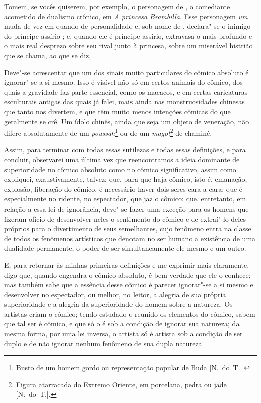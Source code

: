 Tomem, se vocês quiserem, por exemplo, o personagem de , o
comediante acometido de dualismo crônico, em \textit{A princesa
Brambilla}. Esse personagem \textit{um }muda de vez em quando de
personalidade e, sob nome de , declara"-se o inimigo do
príncipe assírio ; e, quando ele é príncipe assírio,
extravasa o mais profundo e o mais real desprezo sobre seu rival junto
à princesa, sobre um miserável histrião que se chama, ao que se diz,
.

Deve"-se acrescentar que um dos sinais muito particulares do cômico
absoluto é ignorar"-se a si mesmo. Isso é visível não só em certos
animais do cômico, dos quais a gravidade faz parte essencial, como os
macacos, e em certas caricaturas esculturais antigas das quais já
falei, mais ainda nas monstruosidades chinesas que tanto nos divertem,
e que têm muito menos intenções cômicas do que geralmente se crê. Um
ídolo chinês, ainda que seja um objeto de veneração, não difere
absolutamente de um \textit{poussah}\footnote{ Busto de um homem gordo
ou representação popular de Buda [N.~do~T.].}\textit{ }ou de um		
\textit{magot}\footnote{ Figura atarracada do Extremo Oriente, em
porcelana, pedra ou jade [N.~do~T.].} de chaminé.

Assim, para terminar com todas essas sutilezas e todas essas definições,
e para concluir, observarei uma última vez que reencontramos a ideia
dominante de superioridade no cômico absoluto como no cômico
significativo, assim como expliquei, exaustivamente, talvez; que, para
que haja cômico, isto é, emanação, explosão, liberação do cômico, é
necessário haver dois seres cara a cara; que é especialmente no
ridente, no espectador, que jaz o cômico; que, entretanto, em relação a
essa lei de ignorância, deve"-se fazer uma exceção para os homens que
fizeram ofício de desenvolver neles o sentimento do cômico e de
extraí"-lo deles próprios para o divertimento de seus semelhantes, cujo
fenômeno entra na classe de todos os fenômenos artísticos que denotam
no ser humano a existência de uma dualidade permanente, o poder de ser
simultaneamente ele mesmo e um outro.

E, para retornar às minhas primeiras definições e me exprimir mais
claramente, digo que, quando  engendra o cômico absoluto, é bem
verdade que ele o conhece; mas também sabe que a essência desse cômico
é parecer ignorar"-se a si mesmo e desenvolver no espectador, ou melhor,
no leitor, a alegria de sua própria superioridade e a alegria da
superioridade do homem sobre a natureza. Os artistas criam o cômico;
tendo estudado e reunido os elementos do cômico, sabem que tal ser é
cômico, e que só o é sob a condição de ignorar sua natureza; da mesma
forma, por uma lei inversa, o artista só é artista sob a condição de
ser duplo e de não ignorar nenhum fenômeno de sua dupla natureza.

